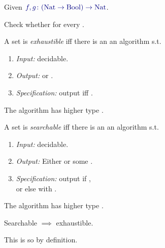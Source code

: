 \documentclass%
[%
Screen4to3,
]{foils}
\begin{document}
Given $\darkblue{f,g \colon (\Nat \to \Bool) \to \Nat}$.

Check whether  for every \darkblue{$\alpha \colon \Nat \to \Bool$}.


A set  is 
\emph{exhaustible} iff there is an an algorithm s.t.

\vfill

\begin{enumerate}
\item[\grey{1.}] \emph{Input:}  decidable.
\item[\grey{2.}] \emph{Output:} \darkblue{$\True$} or \darkblue{$\False$}.
\item[\grey{3.}] \emph{Specification:} output \darkblue{$\True$} iff .
\end{enumerate}

\vfill

The algorithm has higher type .


A set  is 
\emph{searchable} iff there is an an algorithm s.t.

\vfill

\begin{enumerate}
\item[\grey{1.}] \emph{Input:}  decidable.
\item[\grey{2.}] \emph{Output:} Either  or
  some .
\item[\grey{3.}] \emph{Specification:} output 
    if , 
    \\  or else  with
  .
\end{enumerate}

\vfill

The algorithm has higher type .



Searchable $\implies$ exhaustible.

\vfill

This is so by definition. 

\end{document}
